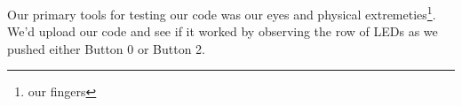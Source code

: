 Our primary tools for testing our code was our eyes and physical extremeties\footnote{our fingers}.
We'd upload our code and see if it worked by observing the row of LEDs as we pushed either Button 0 or Button 2.